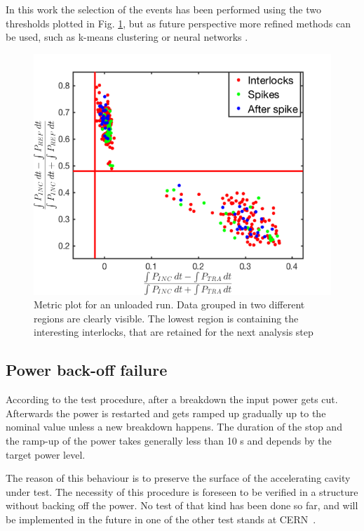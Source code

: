 In this work the selection of the events has been performed using the two thresholds plotted in Fig. \ref{Metric_plot}, but as future perspective more refined methods can be used, such as k-means clustering or neural networks \cite{ML:book}.

\begin{figure}[h]
\centering 
\includegraphics[scale=0.6]{pictures/metric_plt.png}
\caption{Metric plot for an unloaded run. Data grouped in two different regions are clearly visible. The lowest region is containing the interesting interlocks, that are retained for the next analysis step}
\label{Metric_plot}
\end{figure}


\subsection{Power back-off failure}
\label{sec:pbof}

According to the test procedure, after a breakdown the input power gets cut. Afterwards the power is restarted and gets ramped up gradually up to the nominal value unless a new breakdown happens. The duration of the stop and the ramp-up of the power takes generally less than 10 s and depends by the target power level.

The reason of this behaviour is to preserve the surface of the accelerating cavity under test. The necessity of this procedure is foreseen to be verified in a structure without backing off the power. No test of that kind has been done so far, and will be implemented in the future in one of the other test stands at CERN~\cite{Walter:PC}.


